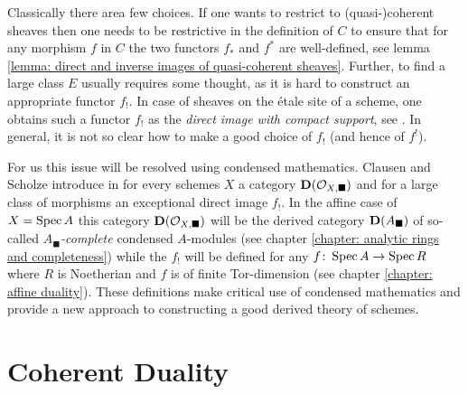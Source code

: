Classically there area few choices. If one wants to restrict to (quasi-)coherent sheaves then one needs to be restrictive in the definition of $C$ to ensure that for any morphism $f$ in $C$ the two functors $f_\ast$ and $f^\ast$ are well-defined, see lemma \ref{lemma: direct and inverse images of quasi-coherent sheaves}. Further, to find a large class $E$ usually requires some thought, as it is hard to construct an appropriate functor $f_!$. In case of sheaves on the étale site of a scheme, one obtains such a functor $f_!$ as the \emph{direct image with compact support}, see \cite[\href{https://stacks.math.columbia.edu/tag/0F4W}{Tag 0F4W}]{stacks-project}. In general, it is not so clear how to make a good choice of $f_!$ (and hence of $f^!$).

For us this issue will be resolved using condensed mathematics. Clausen and Scholze introduce in \cite{condenseddotpdf} for every schemes $X$ a category ${{\mathbf{D}}({{\mathcal{O}}_{X,\blacksquare}})}$ and for a large class of morphisms an exceptional direct image $f_!$. In the affine case of $X=\operatorname{Spec} A$ this category ${{\mathbf{D}}({{\mathcal{O}}_{X, \blacksquare}})}$ will be the derived category ${{\mathbf{D}}(A_\blacksquare)}$ of so-called \emph{$A_\blacksquare$-complete} condensed $A$-modules (see chapter \ref{chapter: analytic rings and completeness}) while the $f_!$ will be defined for any $f\colon \operatorname{Spec} A\to \operatorname{Spec} R$ where $R$ is Noetherian and $f$ is of finite Tor-dimension (see chapter \ref{chapter: affine duality}). These definitions make critical use of condensed mathematics and provide a new approach to constructing a good derived theory of schemes.

%	
%


\section{Coherent Duality}
\label{section: coherent duality}

